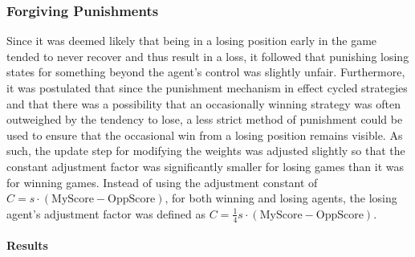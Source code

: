 
\subsubsection*{Forgiving Punishments}
\label{sec:findings-expts-punishments}

Since it was deemed likely that being in a losing position early in the game
tended to never recover and thus result in a loss,
it followed that punishing losing states for something beyond the agent's
control was slightly unfair.
%
Furthermore,
it was postulated that since the punishment mechanism in effect cycled
strategies
and that there was a possibility that an occasionally winning strategy was often
outweighed by the tendency to lose,
a less strict method of punishment could be used to ensure that the occasional
win from a losing position remains visible.
%
As such,
the update step for modifying the weights was adjusted slightly
so that the constant adjustment factor was significantly smaller for losing
games than it was for winning games.
%
Instead of using the adjustment constant of
$C = s \cdot (\text{MyScore} - \text{OppScore})$,
for both winning and losing agents,
the losing agent's adjustment factor was defined as
$C = \frac{1}{4} s \cdot (\text{MyScore} - \text{OppScore})$.

\paragraph*{Results}

